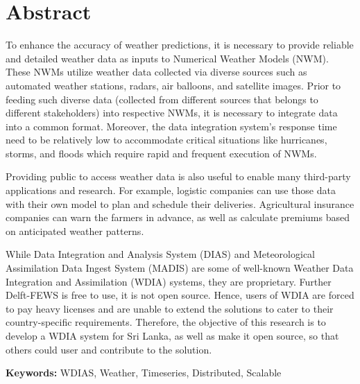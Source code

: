 \documentclass[a4paper,oneside,12pt]{report}
\begin{document}
{ 
\chapter*{Abstract}

To enhance the accuracy of weather predictions, it is necessary to provide reliable and detailed weather data as inputs to Numerical Weather Models (NWM). These NWMs utilize weather data collected via diverse sources such as automated weather stations, radars, air balloons, and satellite images. Prior to feeding such diverse data (collected from different sources that belongs to different stakeholders) into respective NWMs, it is necessary to integrate data into a common format. Moreover, the data integration system’s response time need to be relatively low to accommodate critical situations like hurricanes, storms, and floods which require rapid and frequent execution of NWMs.

Providing public to access weather data is also useful to enable many third-party applications and research. For example, logistic companies can use those data with their own model to plan and schedule their deliveries. Agricultural insurance companies can warn the farmers in advance, as well as calculate premiums based on anticipated weather patterns.

While Data Integration and Analysis System (DIAS) and Meteorological Assimilation Data Ingest System (MADIS) are some of well-known Weather Data Integration and Assimilation (WDIA) systems, they are proprietary. Further Delft-FEWS is free to use, it is not open source. Hence, users of WDIA are forced to pay heavy licenses and are unable to extend the solutions to cater to their country-specific requirements. Therefore, the objective of this research is to develop a WDIA system for Sri Lanka, as well as make it open source, so that others could user and contribute to the solution.

\vspace{4mm}

\textbf{Keywords:} WDIAS, Weather, Timeseries, Distributed, Scalable

}
\restoregeometry
\normalsize

\end{document}
